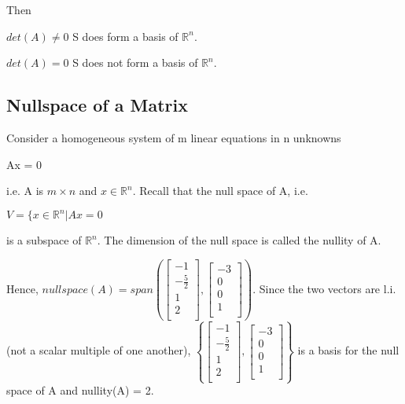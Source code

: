 \documentclass{extarticle}
\begin{document}
\begin{multicols}{4}
\begin{tcolorbox}[enhanced jigsaw,sharp corners,coltext=black,colback=BurntOrange!25!white,boxrule=0pt,breakable,size=minimal]
Then

$det(A) \neq 0$ S does form a basis of ${\mathbb{R}}^n$.

$det(A) = 0$ S does not form a basis of ${\mathbb{R}}^n$.

\end{tcolorbox}



\subsection{Nullspace of a Matrix}
Consider a homogeneous system of m linear equations in n unknowns

Ax = 0

i.e. A is $m \times n$ and $x \in {\mathbb{R}}^n$. Recall that the null space of A, i.e.

$V = \{ x \in {\mathbb{R}}^n | Ax = 0$

is a subspace of ${\mathbb{R}}^n$. The dimension of the null space is called the nullity of A.

\begin{tcolorbox}[enhanced jigsaw,sharp corners,coltext=black,colback=BurntOrange!25!white,boxrule=0pt,breakable,size=minimal]

Hence, $null space(A) = span \left( \left[ \begin{matrix} -1\\-\frac{5}{2}\\1\\2\\\end{matrix} \right], \left[ \begin{matrix} -3\\0\\0\\1\\ \end{matrix} \right] \right)$. Since the two vectors are l.i. (not a scalar multiple of one another), $\left\{ \left[ \begin{matrix} -1\\-\frac{5}{2}\\1\\2\\\end{matrix} \right], \left[ \begin{matrix} -3\\0\\0\\1\\ \end{matrix} \right] \right\}$ is a basis for the null space of A and nullity(A) = 2.



\end{tcolorbox}
\end{multicols}
\end{document}
